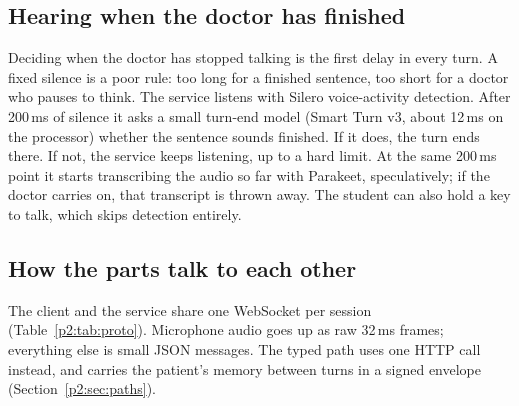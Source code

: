 \documentclass[journal]{IEEEtran}
\begin{document}
\subsection{Hearing when the doctor has finished}
Deciding when the doctor has stopped talking is the first delay in every turn. A fixed silence is a poor rule: too long for a finished sentence,
too short for a doctor who pauses to think. The service listens with Silero voice-activity detection. After 200\,ms of silence it asks a small turn-end model (Smart Turn v3, about 12\,ms on the processor) whether the sentence sounds finished. If it does, the turn ends there. If not, the service keeps listening, up to a hard limit. At the same 200\,ms point it starts transcribing the audio so far with Parakeet, speculatively; if the
doctor carries on, that transcript is thrown away. The student can also hold a key to talk, which skips detection entirely.

\subsection{How the parts talk to each other}
The client and the service share one WebSocket per session (Table~\ref{p2:tab:proto}). Microphone audio goes up as raw 32\,ms frames; everything
else is small JSON messages. The typed path uses one HTTP call instead, and carries the patient's memory between turns in a signed envelope
(Section~\ref{p2:sec:paths}).
\end{document}
